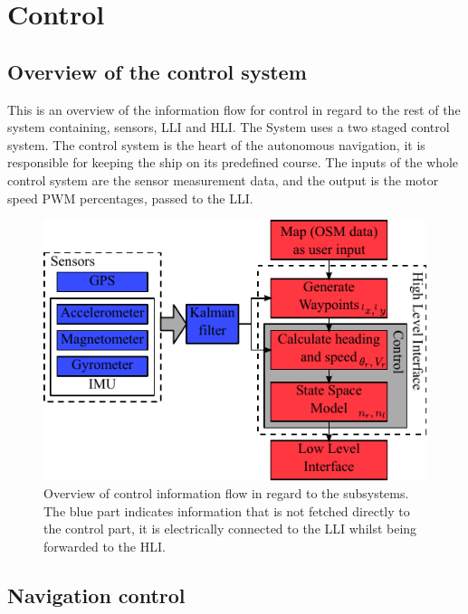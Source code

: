 \chapter{Control}
\label{chap:control}

\section{Overview of the control system}
This is an overview of the information flow for control in regard to the rest of the system containing, sensors, \ac{LLI} and \ac{HLI}. The System uses a two staged control system. The control system is the heart of the autonomous navigation, it is responsible for keeping the ship on its predefined course. The inputs of the whole control system are the sensor measurement data, and the output is the motor speed \ac{PWM} percentages, passed to the \ac{LLI}.

\begin{figure}[htbp]
	\centering
	\includegraphics[width=\textwidth]{img/vessel-block-overview}
	\caption{Overview of control information flow in regard to the subsystems. The blue part indicates information that is not fetched directly to the control part, it is electrically connected to the \ac{LLI} whilst being forwarded to the \ac{HLI}.}
	\label{fig:vessel-block-overview}
\end{figure}


\section{Navigation control}
